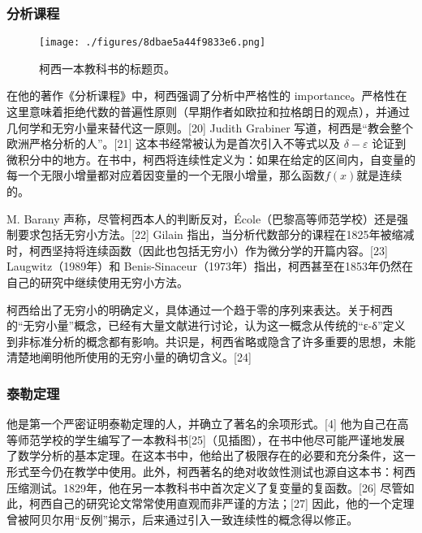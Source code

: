 \subsubsection{分析课程}
\begin{figure}[ht]
\centering
\texttt{[image: ./figures/8dbae5a44f9833e6.png]}
\caption{柯西一本教科书的标题页。} \label{fig_August_3}
\end{figure}
在他的著作《分析课程》中，柯西强调了分析中严格性的 importance。严格性在这里意味着拒绝代数的普遍性原则（早期作者如欧拉和拉格朗日的观点），并通过几何学和无穷小量来替代这一原则。[20] Judith Grabiner 写道，柯西是“教会整个欧洲严格分析的人”。[21] 这本书经常被认为是首次引入不等式以及 \(\delta - \varepsilon\) 论证到微积分中的地方。在书中，柯西将连续性定义为：如果在给定的区间内，自变量的每一个无限小增量都对应着因变量的一个无限小增量，那么函数\(f(x)\)就是连续的。

M. Barany 声称，尽管柯西本人的判断反对，École（巴黎高等师范学校）还是强制要求包括无穷小方法。[22] Gilain 指出，当分析代数部分的课程在1825年被缩减时，柯西坚持将连续函数（因此也包括无穷小）作为微分学的开篇内容。[23] Laugwitz（1989年）和 Benis-Sinaceur（1973年）指出，柯西甚至在1853年仍然在自己的研究中继续使用无穷小方法。

柯西给出了无穷小的明确定义，具体通过一个趋于零的序列来表达。关于柯西的“无穷小量”概念，已经有大量文献进行讨论，认为这一概念从传统的“ε-δ”定义到非标准分析的概念都有影响。共识是，柯西省略或隐含了许多重要的思想，未能清楚地阐明他所使用的无穷小量的确切含义。[24]
\subsubsection{泰勒定理}
他是第一个严密证明泰勒定理的人，并确立了著名的余项形式。[4] 他为自己在高等师范学校的学生编写了一本教科书[25]（见插图），在书中他尽可能严谨地发展了数学分析的基本定理。在这本书中，他给出了极限存在的必要和充分条件，这一形式至今仍在教学中使用。此外，柯西著名的绝对收敛性测试也源自这本书：柯西压缩测试。1829年，他在另一本教科书中首次定义了复变量的复函数。[26] 尽管如此，柯西自己的研究论文常常使用直观而非严谨的方法；[27] 因此，他的一个定理曾被阿贝尔用“反例”揭示，后来通过引入一致连续性的概念得以修正。

